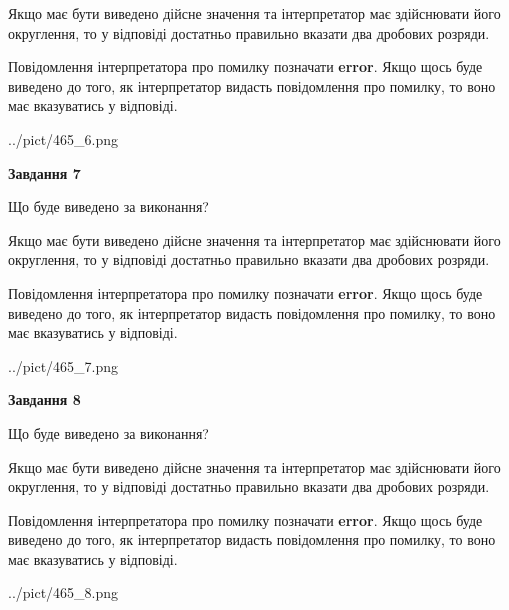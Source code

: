 \documentclass[12pt, ukrainian]{article}
\begin{document}
{\begin {Large}
Якщо має бути виведено дійсне значення та інтерпретатор має здійснювати його округлення, 
то у відповіді достатньо правильно вказати два дробових розряди.

Повідомлення інтерпретатора про помилку позначати \textbf{error}.
Якщо щось буде виведено до того, як інтерпретатор видасть повідомлення про помилку, 
то воно має вказуватись у відповіді. \par

\begin{center}
	{../pict/465_6.png}
\end{center}
\newpage

{\begin {center}\textbf{Завдання 7}\end {center}}\par
Що буде виведено за виконання? \par

Якщо має бути виведено дійсне значення та інтерпретатор має здійснювати його округлення, 
то у відповіді достатньо правильно вказати два дробових розряди.

Повідомлення інтерпретатора про помилку позначати \textbf{error}.
Якщо щось буде виведено до того, як інтерпретатор видасть повідомлення про помилку, 
то воно має вказуватись у відповіді. \par

\begin{center}
	{../pict/465_7.png}
\end{center}
\newpage

{\begin {center}\textbf{Завдання 8}\end {center}}\par
Що буде виведено за виконання? \par

Якщо має бути виведено дійсне значення та інтерпретатор має здійснювати його округлення, 
то у відповіді достатньо правильно вказати два дробових розряди.

Повідомлення інтерпретатора про помилку позначати \textbf{error}.
Якщо щось буде виведено до того, як інтерпретатор видасть повідомлення про помилку, 
то воно має вказуватись у відповіді. \par

\begin{center}
	{../pict/465_8.png}
\end{center}
\newpage


\end{Large}}
\end{document}
